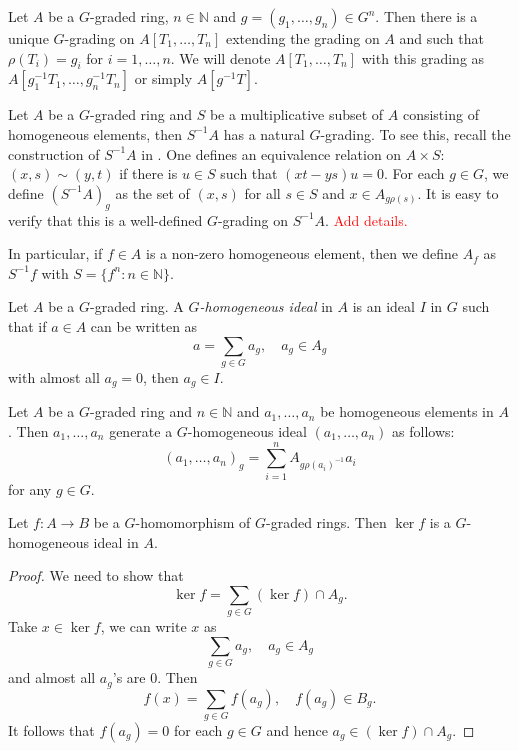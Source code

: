 \begin{example}
    Let $A$ be a $G$-graded ring, $n\in \mathbb{N}$ and $g=(g_1,\ldots,g_n)\in G^n$. Then there is a unique $G$-grading on $A[T_1,\ldots,T_n]$ extending the grading on $A$ and such that $\rho(T_i)=g_i$ for $i=1,\ldots,n$. We will denote $A[T_1,\ldots,T_n]$ with this grading as $A[g_{1}^{-1}T_1,\ldots,g_{n}^{-1}T_n]$ or simply $A[g^{-1}T]$.
\end{example}

\begin{example}\label{ex-localizationgradedring}
    Let $A$ be a $G$-graded ring and $S$ be a multiplicative subset of $A$ consisting of homogeneous elements, then $S^{-1}A$ has a natural $G$-grading. To see this, recall the construction of $S^{-1}A$ in \cite[\href{https://stacks.math.columbia.edu/tag/00CM}{Tag 00CM}]{stacks-project}. One defines an equivalence relation on $A\times S$: $(x,s)\sim (y,t)$ if there is $u\in S$ such that $(xt-ys)u=0$. For each $g\in G$, we define $(S^{-1}A)_g$ as the set of $(x,s)$ for all $s\in S$ and $x\in A_{g\rho(s)}$. It is easy to verify that this is a well-defined $G$-grading on $S^{-1}A$.  \textcolor{red}{Add details.}

    In particular, if $f\in A$ is a non-zero homogeneous element, then we define $A_f$ as $S^{-1}f$ with $S=\{f^n:n\in \mathbb{N}\}$.
\end{example}

\begin{definition}
    Let $A$ be a $G$-graded ring. A \emph{$G$-homogeneous ideal} in $A$ is an ideal $I$ in $G$ such that if $a\in A$ can be written as 
    \[
        a=\sum_{g\in G} a_g,\quad a_g\in A_g  
    \]
    with almost all $a_g=0$, then $a_g\in I$.
\end{definition}
\begin{example}\label{ex-homogeneousidealgeneratedbyelements}
    Let $A$ be a $G$-graded ring and $n\in \mathbb{N}$ and $a_1,\ldots,a_n$ be homogeneous elements in $A$. Then $a_1,\ldots,a_n$ generate a $G$-homogeneous ideal $(a_1,\ldots,a_n)$ as follows:
    \[
        (a_1,\ldots,a_n)_g=\sum_{i=1}^n A_{g \rho(a_i)^{-1}}a_i
    \]
    for any $g\in G$.
\end{example}





\begin{lemma}\label{lma-kernelghomogeneous}
    Let $f:A\rightarrow B$ be a $G$-homomorphism of $G$-graded rings. Then $\ker f$ is a $G$-homogeneous ideal in $A$.
\end{lemma}
\begin{proof}
    We need to show that
    \[
        \ker f=\sum_{g\in G} (\ker f)\cap A_g.  
    \]
    Take $x\in \ker f$, we can write $x$ as 
    \[
        \sum_{g\in G} a_g,\quad a_g\in A_g
    \]
    and almost all $a_g$'s are $0$. Then 
    \[
        f(x)=  \sum_{g\in G} f(a_g),\quad f(a_g)\in B_g.
    \]
    It follows that $f(a_g)=0$ for each $g\in G$ and hence $a_g\in (\ker f)\cap A_g$.
\end{proof}

